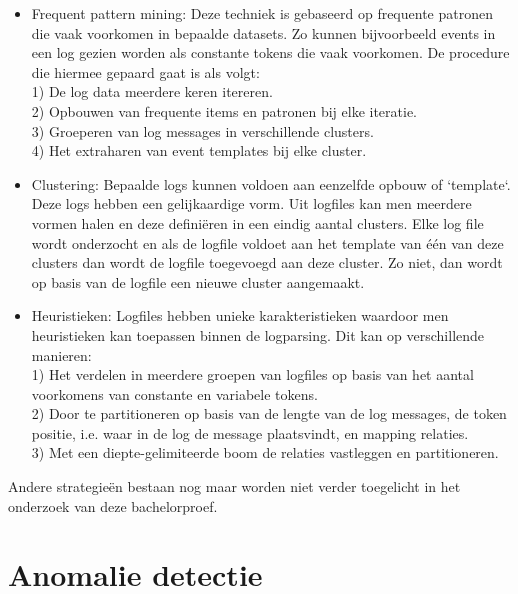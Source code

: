 \begin{itemize}
    \item Frequent pattern mining: Deze techniek is gebaseerd op frequente patronen die vaak voorkomen in bepaalde datasets.
    Zo kunnen bijvoorbeeld events in een log gezien worden als constante tokens die vaak voorkomen. De procedure die hiermee gepaard gaat is als volgt:\\
     1) De log data meerdere keren itereren.\\
     2) Opbouwen van frequente items en patronen bij elke iteratie.\\
     3) Groeperen van log messages in verschillende clusters.\\
     4) Het extraharen van event templates bij elke cluster. 
    \item Clustering: Bepaalde logs kunnen voldoen aan eenzelfde opbouw of `template`. Deze logs hebben een gelijkaardige vorm. Uit logfiles kan men meerdere vormen halen en deze definiëren in een eindig aantal clusters. Elke log file wordt onderzocht en als de logfile voldoet aan het template van één van deze clusters dan wordt de logfile toegevoegd aan deze cluster. Zo niet, dan wordt op basis van de logfile een nieuwe cluster aangemaakt.
    \item Heuristieken: Logfiles hebben unieke karakteristieken waardoor men heuristieken kan toepassen binnen de logparsing. Dit kan op verschillende manieren:\\
    1) Het verdelen in meerdere groepen van logfiles op basis van het aantal voorkomens van constante en variabele tokens.\\
    2) Door te partitioneren op basis van de lengte van de log messages, de token positie, i.e. waar in de log de message plaatsvindt, en mapping relaties.\\
    3) Met een diepte-gelimiteerde boom de relaties vastleggen en partitioneren.
\end{itemize}
Andere strategieën bestaan nog maar worden niet verder toegelicht in het onderzoek van deze bachelorproef.

\section{Anomalie detectie}

